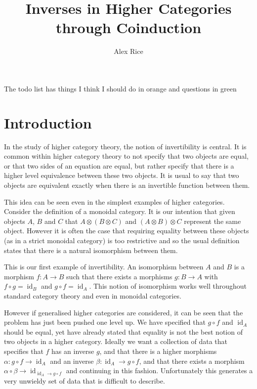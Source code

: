 \documentclass{article}
\title{Inverses in Higher Categories through Coinduction}
\author{Alex Rice}
\theoremstyle{definition}
\theoremstyle{remark}
\DeclareMathOperator{\id}{id}
\begin{document}
\maketitle

The todo list has things I think I should do in orange and questions in green
\listoftodos{}

\begin{abstract}
\end{abstract}
\section{Introduction}\label{sec:intro}

In the study of higher category theory, the notion of invertibility is central. It is common within higher category theory to not specify that two objects are equal, or that two sides of an equation are equal, but rather specify that there is a higher level equivalence between these two objects. It is usual to say that two objects are equivalent exactly when there is an invertible function between them.

This idea can be seen even in the simplest examples of higher categories. Consider the definition of a monoidal category. It is our intention that given objects \(A\), \(B\) and \(C\) that \(A \otimes (B \otimes C)\) and \((A \otimes B) \otimes C\) represent the same object. However it is often the case that requiring equality between these objects (as in a strict monoidal category) is too restrictive and so the usual definition states that there is a natural isomorphism between them.

This is our first example of invertibility. An isomorphism between \(A\) and \(B\) is a morphism \(f : A \to B\) such that there exists a morphisms \(g : B \to A\) with \(f \circ g = \id_B\) and \(g \circ f = \id_A\). This notion of isomorphism works well throughout standard category theory and even in monoidal categories.

However if generalised higher categories are considered, it can be seen that the problem has just been pushed one level up. We have specified that \(g \circ f\) and \(\id_A\) should be equal, yet have already stated that equality is not the best notion of two objects in a higher category. Ideally we want a collection of data that specifies that \(f\) has an inverse \(g\), and that there is a higher morphisms \(\alpha : g \circ f \to \id_A\) and an inverse \(\beta : \id_A \to g \circ f\), and that there exists a morphism \(\alpha \circ \beta \to \id_{\id_A \to g \circ f}\) and continuing in this fashion. Unfortunately this generates a very unwieldy set of data that is difficult to describe.
\end{document}
